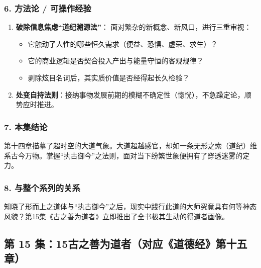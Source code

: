 \subsubsection{6. 方法论 / 可操作经验}
\begin{enumerate}
    \item \textbf{破除信息焦虑“道纪溯源法”}：
    面对繁杂的新概念、新风口，进行三重审视：
    \begin{itemize}
        \item 它触动了人性的哪些恒久需求（便益、恐惧、虚荣、求生）？
        \item 它的商业逻辑是否契合投入产出与能量守恒的客观规律？
        \item 剥除炫目名词后，其实质价值是否经得起长久检验？
    \end{itemize}
    \item \textbf{处变自持法则}：接纳事物发展前期的模糊不确定性（惚恍），不急躁定论，顺势应时推进。
\end{enumerate}

\subsubsection{7. 本集结论}
第十四章描摹了超时空的大道气象。大道超越感官，却如一条无形之索（道纪）维系古今万物。掌握“执古御今”之法则，面对当下纷繁世象便拥有了穿透迷雾的定力。

\subsubsection{8. 与整个系列的关系}
知晓了形而上之道体与“执古御今”之后，现实中践行此道的大师究竟具有何等神态风貌？第15集《古之善为道者》立即推出了全书极其生动的得道者画像。

\clearpage

\subsection{第 15 集：15古之善为道者（对应《道德经》第十五章）}
\label{sec:ep15}


